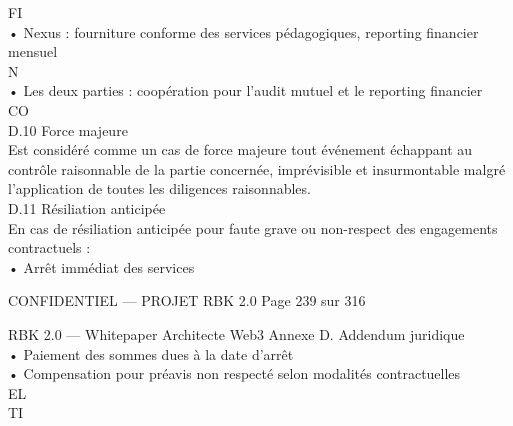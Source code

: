 \documentclass[12pt,landscape,a4paper]{article}
\newenvironment{confidential}
{\begin{tcolorbox}[
    colback=rbkred!5!white,
    colframe=rbkred!75!black,
    title=CONFIDENTIEL,
    fonttitle=\bfseries\color{white},
    coltitle=rbkred!75!black,
    breakable,
    enhanced,
    frame hidden,
    borderline west={2pt}{0pt}{rbkred!75!black}
]}
{\end{tcolorbox}}
\begin{document}
\vspace{0.5em}
FI\\
• Nexus : fourniture conforme des services pédagogiques, reporting financier mensuel\\
\vspace{0.5em}
\vspace{0.5em}
\vspace{0.5em}
N\\
• Les deux parties : coopération pour l’audit mutuel et le reporting financier\\
CO\\
D.10 Force majeure\\
Est considéré comme un cas de force majeure tout événement échappant au contrôle raisonnable de la partie concernée, imprévisible et insurmontable malgré\\
l’application de toutes les diligences raisonnables.\\
\vspace{0.5em}
\vspace{0.5em}
\vspace{0.5em}
D.11 Résiliation anticipée\\
En cas de résiliation anticipée pour faute grave ou non-respect des engagements contractuels :\\
\vspace{0.5em}
• Arrêt immédiat des services\\
\vspace{0.5em}
\vspace{0.5em}
\begin{confidential}CONFIDENTIEL — PROJET RBK 2.0                                            Page 239 sur 316\end{confidential}
RBK 2.0 — Whitepaper Architecte Web3                                                    Annexe D. Addendum juridique\\
\vspace{0.5em}
\vspace{0.5em}
• Paiement des sommes dues à la date d’arrêt\\
\vspace{0.5em}
• Compensation pour préavis non respecté selon modalités contractuelles\\
\vspace{0.5em}
\vspace{0.5em}
\vspace{0.5em}
\vspace{0.5em}
EL\\
TI\\
\end{document}
